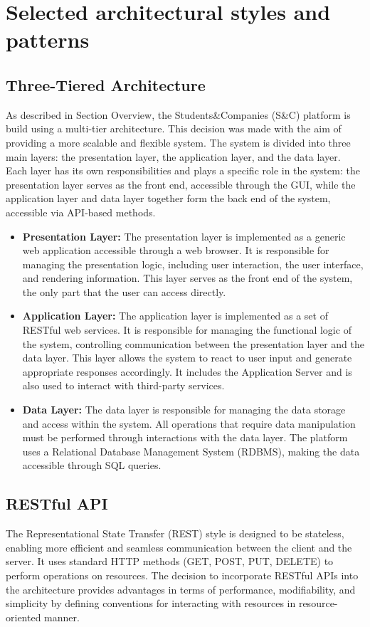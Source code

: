 \section{Selected architectural styles and patterns}\label{sec:selected architectural styles and patterns}
\subsection{Three-Tiered Architecture}\label{subsec:three-tiered architecture}
As described in Section Overview, the Students\&Companies (S\&C) platform is build using a multi-tier architecture. This decision was made with the aim of 
providing a more scalable and flexible system.
The system is divided into three main layers: the presentation layer, the application layer, and the data layer.
Each layer has its own responsibilities and plays a specific role in the system: the presentation layer serves as the front end, accessible through the GUI, 
while the application layer and data layer together form the back end of the system, accessible via API-based methods.
\begin{itemize}
    \item \textbf{Presentation Layer:} The presentation layer is implemented as a generic web application accessible through a web browser.
    It is responsible for managing the presentation logic, including user interaction, the user interface, and rendering information.
    This layer serves as the front end of the system, the only part that the user can access directly.
    \item \textbf{Application Layer:} The application layer is implemented as a set of RESTful web services.
    It is responsible for managing the functional logic of the system, controlling communication between the presentation layer and the data layer.
    This layer allows the system to react to user input and generate appropriate responses accordingly.
    It includes the Application Server and is also used to interact with third-party services.
    \item \textbf{Data Layer:} The data layer is responsible for managing the data storage and access within the system.
    All operations that require data manipulation must be performed through interactions with the data layer.
    The platform uses a Relational Database Management System (RDBMS), making the data accessible through SQL queries.
\end{itemize}
\subsection{RESTful API}\label{subsec:restful api}
The Representational State Transfer (REST) style is designed to be stateless, enabling more efficient and seamless communication between the client and the server.
It uses standard HTTP methods (GET, POST, PUT, DELETE) to perform operations on resources.
The decision to incorporate RESTful APIs into the architecture provides advantages in terms of performance, modifiability, and simplicity by defining conventions 
for interacting with resources in resource-oriented manner.
